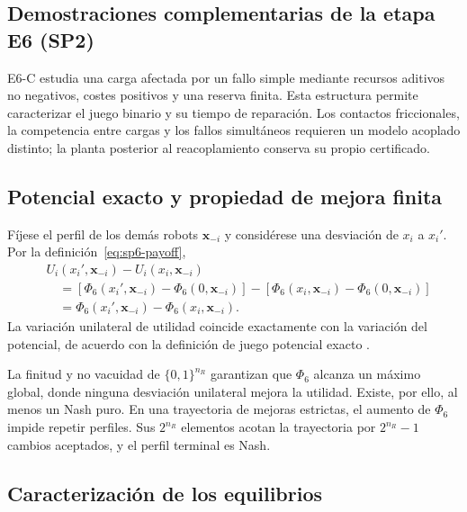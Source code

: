 \subsection{Demostraciones complementarias de la etapa E6 (SP2)}
\label{app:sp6-proofs}

E6-C estudia una carga afectada por un fallo simple mediante recursos aditivos no negativos, costes positivos y una reserva finita. Esta estructura permite caracterizar el juego binario y su tiempo de reparación. Los contactos friccionales, la competencia entre cargas y los fallos simultáneos requieren un modelo acoplado distinto; la planta posterior al reacoplamiento conserva su propio certificado.

\subsection{Potencial exacto y propiedad de mejora finita}
\label{app:sp6-exact-potential-proof}

Fíjese el perfil de los demás robots $\boldsymbol x_{-i}$ y considérese una desviación de $x_i$ a $x_i'$. Por la definición~\eqref{eq:sp6-payoff},
\begin{align*}
 &U_i(x_i',\boldsymbol x_{-i})-U_i(x_i,\boldsymbol x_{-i})\\
 &\quad=\left[\Phi_6(x_i',\boldsymbol x_{-i})-\Phi_6(0,\boldsymbol x_{-i})\right]
 -\left[\Phi_6(x_i,\boldsymbol x_{-i})-\Phi_6(0,\boldsymbol x_{-i})\right]\\
 &\quad=\Phi_6(x_i',\boldsymbol x_{-i})-\Phi_6(x_i,\boldsymbol x_{-i}).
\end{align*}
La variación unilateral de utilidad coincide exactamente con la variación del potencial, de acuerdo con la definición de juego potencial exacto \parencite{monderer1996potential}.

La finitud y no vacuidad de \(\{0,1\}^{n_R}\) garantizan que \(\Phi_6\) alcanza un máximo global, donde ninguna desviación unilateral mejora la utilidad. Existe, por ello, al menos un Nash puro. En una trayectoria de mejoras estrictas, el aumento de \(\Phi_6\) impide repetir perfiles. Sus \(2^{n_R}\) elementos acotan la trayectoria por \(2^{n_R}-1\) cambios aceptados, y el perfil terminal es Nash.

\ifdefined\VIUFullSPsixProofs
\subsection{Caracterización de los equilibrios}
\label{app:sp6-nash-characterization}

